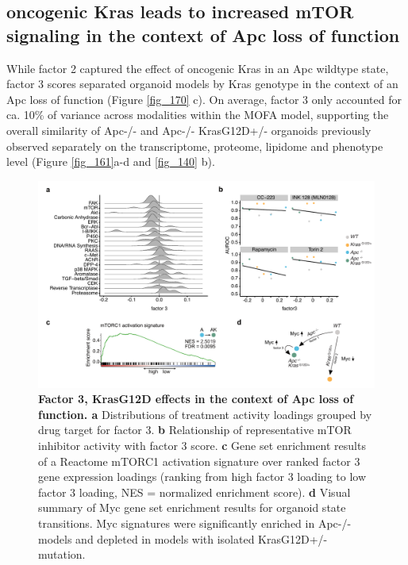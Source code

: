 \begin{flushleft}
\bigbreak




\newpage
\section{oncogenic Kras leads to increased mTOR signaling in the context of Apc loss of function}

While factor 2 captured the effect of oncogenic Kras in an Apc wildtype state, factor 3 scores separated organoid models by Kras genotype in the context of an Apc loss of function (Figure \ref{fig_170} c). On average, factor 3 only accounted for ca. 10\% of variance across modalities within the MOFA model, supporting the overall similarity of Apc-/- and Apc-/- KrasG12D+/- organoids previously observed separately on the transcriptome, proteome, lipidome and phenotype level (Figure \ref{fig_161}a-d and \ref{fig_140} b).

\begin{figure}[h]
\centering
\includegraphics[scale=0.75,
                keepaspectratio]{figures/adenomaprofiling/pdf/fig_4_1.pdf}
\caption{\textbf{Factor 3, KrasG12D effects in the context of Apc loss of function. a} Distributions of treatment activity loadings grouped by drug target for factor 3. \textbf{b} Relationship of representative mTOR inhibitor activity with factor 3 score. \textbf{c} Gene set enrichment results of a Reactome mTORC1 activation signature over ranked factor 3 gene expression loadings (ranking from high factor 3 loading to low factor 3 loading, NES = normalized enrichment score). \textbf{d} Visual summary of Myc gene set enrichment results for organoid state transitions. Myc signatures were significantly enriched in Apc-/- models and depleted in models with isolated KrasG12D+/- mutation.}
\label{fig_300}
\end{figure}
\bigbreak


\end{flushleft}
